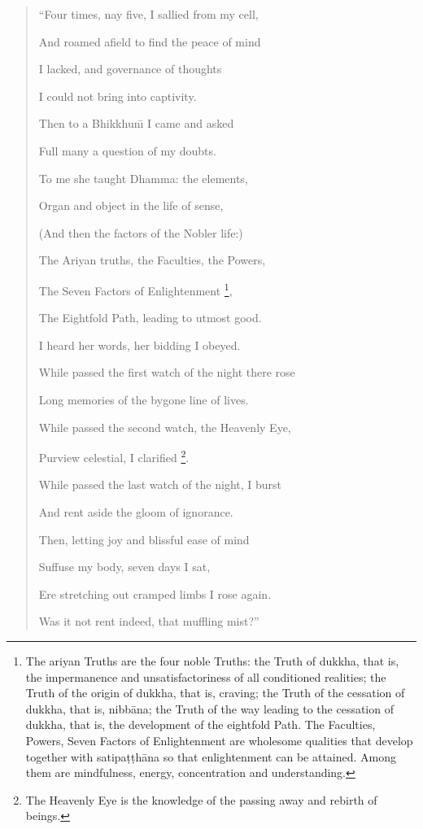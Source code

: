 \documentclass{book}
\begin{document}
\begin{verse}
``Four times, nay five, I sallied from my cell,

And roamed afield to find the peace of mind

I lacked, and governance of thoughts

I could not bring into captivity.

Then to a Bhikkhun\=\i{}  I came and asked

Full many a question of my doubts.

To me she taught Dhamma: the elements,

Organ and object in the life of sense,

(And then the factors of the Nobler life:)

The Ariyan truths, the Faculties, the Powers,

The Seven Factors of Enlightenment
\footnote{The ariyan Truths are the
four noble Truths: the Truth of dukkha, that is, the impermanence and
unsatisfactoriness of all conditioned realities; the Truth of the
origin of dukkha, that is, craving; the Truth of the cessation of
dukkha, that is, nibb{\=a}na; the Truth of the way leading to the
cessation of dukkha, that is, the development of the eightfold Path.
The Faculties, Powers, Seven Factors of Enlightenment are
wholesome qualities that develop together with satipa\d t\d th{\=a}na so
that enlightenment can be attained. Among them are mindfulness, energy,
concentration and understanding.}, 


The Eightfold Path, leading to utmost good.

I heard her words, her bidding I obeyed.

While passed the first watch of the night there rose

Long memories of the bygone line of lives.

While passed the second watch, the Heavenly Eye,

Purview celestial, I clarified 
\footnote{The Heavenly Eye is the
knowledge of the passing away and rebirth of beings.}. 

While passed the last watch of the night, I burst

And rent aside the gloom of ignorance.

Then, letting joy and blissful ease of mind

Suffuse my body, seven days I sat,

Ere stretching out cramped limbs I rose again.

Was it not rent indeed, that muffling mist?''
\end{verse}
\end{document}
